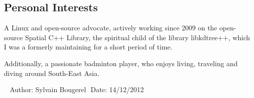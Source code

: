 \documentclass[overlapped,line,letterpaper]{res}
\begin{document}
\begin{resume}

  \section{\bf Personal Interests}

  A Linux and open-source advocate, actively working since 2009 on the
  open-source Spatial C++ Library, the spiritual child of the library
  libkdtree++, which I was a formerly maintaining for a short period of time.

  Additionally, a passionate badminton player, who enjoys living, traveling and
  diving around South-East Asia.


  \begin{center}
    \vspace{\fill}\ \newline
           {\tiny \rm $ $Author: Sylvain Bougerel $ $ }
           {\tiny \rm $ $Date: 14/12/2012 $ $ }
  \end{center}

\end{resume}
\end{document}
